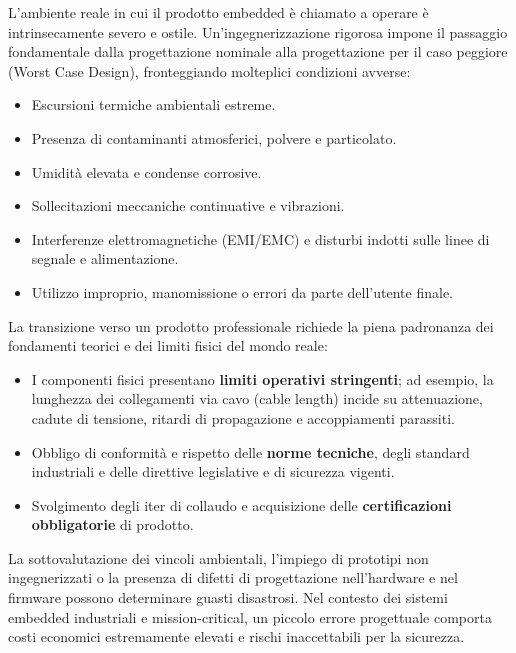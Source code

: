 L'ambiente reale in cui il prodotto embedded è chiamato a operare è intrinsecamente severo e ostile. Un'ingegnerizzazione rigorosa impone il passaggio fondamentale dalla progettazione nominale alla progettazione per il caso peggiore (Worst Case Design), fronteggiando molteplici condizioni avverse:
\begin{itemize}
    \item Escursioni termiche ambientali estreme.
    \item Presenza di contaminanti atmosferici, polvere e particolato.
    \item Umidità elevata e condense corrosive.
    \item Sollecitazioni meccaniche continuative e vibrazioni.
    \item Interferenze elettromagnetiche (EMI/EMC) e disturbi indotti sulle linee di segnale e alimentazione.
    \item Utilizzo improprio, manomissione o errori da parte dell'utente finale.
\end{itemize}

La transizione verso un prodotto professionale richiede la piena padronanza dei fondamenti teorici e dei limiti fisici del mondo reale:
\begin{itemize}
    \item I componenti fisici presentano \textbf{limiti operativi stringenti}; ad esempio, la lunghezza dei collegamenti via cavo (cable length) incide su attenuazione, cadute di tensione, ritardi di propagazione e accoppiamenti parassiti.
    \item Obbligo di conformità e rispetto delle \textbf{norme tecniche}, degli standard industriali e delle direttive legislative e di sicurezza vigenti.
    \item Svolgimento degli iter di collaudo e acquisizione delle \textbf{certificazioni obbligatorie} di prodotto.
\end{itemize}

La sottovalutazione dei vincoli ambientali, l'impiego di prototipi non ingegnerizzati o la presenza di difetti di progettazione nell'hardware e nel firmware possono determinare guasti disastrosi. Nel contesto dei sistemi embedded industriali e mission-critical, un piccolo errore progettuale comporta costi economici estremamente elevati e rischi inaccettabili per la sicurezza.
